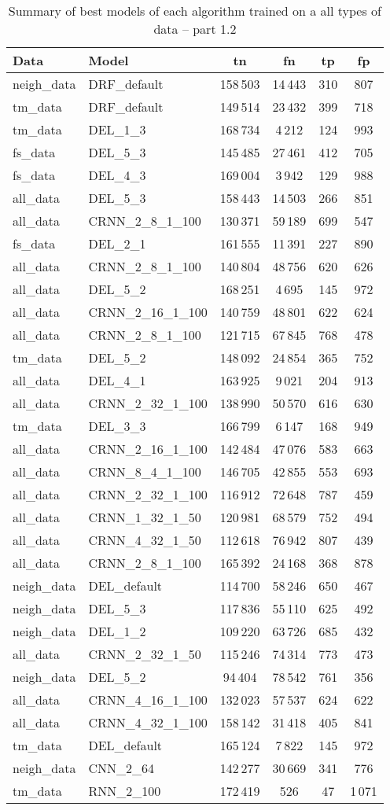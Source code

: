 \documentclass[thesis=M,english]{FITthesis}[2012/10/20]
\begin{document}
\begin{table}[H]\centering
\begin{small}
    \caption{Summary of best models of each algorithm trained on a all types of data -- part 1.2}\label{tab:all_data_summary_1_2}
    \begin{tabular}{|l|l|c|c|c|c|}\hline
Data & Model & \gls{tn} & \gls{fn} & \gls{tp} & \gls{fp} \tabularnewline \hline \hline
neigh\_data & DRF\_default & 158\,503 & 14\,443 & 310 & 807 \tabularnewline  \hline 
tm\_data & DRF\_default & 149\,514 & 23\,432 & 399 & 718 \tabularnewline  \hline 
tm\_data & DEL\_1\_3 & 168\,734 & 4\,212 & 124 & 993 \tabularnewline  \hline 
fs\_data & DEL\_5\_3 & 145\,485 & 27\,461 & 412 & 705 \tabularnewline  \hline 
fs\_data & DEL\_4\_3 & 169\,004 & 3\,942 & 129 & 988 \tabularnewline  \hline 
all\_data & DEL\_5\_3 & 158\,443 & 14\,503 & 266 & 851 \tabularnewline  \hline 
all\_data & CRNN\_2\_8\_1\_100 & 130\,371 & 59\,189 & 699 & 547 \tabularnewline  \hline 
fs\_data & DEL\_2\_1 & 161\,555 & 11\,391 & 227 & 890 \tabularnewline  \hline 
all\_data & CRNN\_2\_8\_1\_100 & 140\,804 & 48\,756 & 620 & 626 \tabularnewline  \hline 
all\_data & DEL\_5\_2 & 168\,251 & 4\,695 & 145 & 972 \tabularnewline  \hline 
all\_data & CRNN\_2\_16\_1\_100 & 140\,759 & 48\,801 & 622 & 624 \tabularnewline  \hline 
all\_data & CRNN\_2\_8\_1\_100 & 121\,715 & 67\,845 & 768 & 478 \tabularnewline  \hline 
tm\_data & DEL\_5\_2 & 148\,092 & 24\,854 & 365 & 752 \tabularnewline  \hline 
all\_data & DEL\_4\_1 & 163\,925 & 9\,021 & 204 & 913 \tabularnewline  \hline 
all\_data & CRNN\_2\_32\_1\_100 & 138\,990 & 50\,570 & 616 & 630 \tabularnewline  \hline 
tm\_data & DEL\_3\_3 & 166\,799 & 6\,147 & 168 & 949 \tabularnewline  \hline 
all\_data & CRNN\_2\_16\_1\_100 & 142\,484 & 47\,076 & 583 & 663 \tabularnewline  \hline 
all\_data & CRNN\_8\_4\_1\_100 & 146\,705 & 42\,855 & 553 & 693 \tabularnewline  \hline 
all\_data & CRNN\_2\_32\_1\_100 & 116\,912 & 72\,648 & 787 & 459 \tabularnewline  \hline 
all\_data & CRNN\_1\_32\_1\_50 & 120\,981 & 68\,579 & 752 & 494 \tabularnewline  \hline 
all\_data & CRNN\_4\_32\_1\_50 & 112\,618 & 76\,942 & 807 & 439 \tabularnewline  \hline 
all\_data & CRNN\_2\_8\_1\_100 & 165\,392 & 24\,168 & 368 & 878 \tabularnewline  \hline 
neigh\_data & DEL\_default & 114\,700 & 58\,246 & 650 & 467 \tabularnewline  \hline 
neigh\_data & DEL\_5\_3 & 117\,836 & 55\,110 & 625 & 492 \tabularnewline  \hline 
neigh\_data & DEL\_1\_2 & 109\,220 & 63\,726 & 685 & 432 \tabularnewline  \hline 
all\_data & CRNN\_2\_32\_1\_50 & 115\,246 & 74\,314 & 773 & 473 \tabularnewline  \hline 
neigh\_data & DEL\_5\_2 & 94\,404 & 78\,542 & 761 & 356 \tabularnewline  \hline 
all\_data & CRNN\_4\_16\_1\_100 & 132\,023 & 57\,537 & 624 & 622 \tabularnewline  \hline 
all\_data & CRNN\_4\_32\_1\_100 & 158\,142 & 31\,418 & 405 & 841 \tabularnewline  \hline 
tm\_data & DEL\_default & 165\,124 & 7\,822 & 145 & 972 \tabularnewline  \hline 
neigh\_data & CNN\_2\_64 & 142\,277 & 30\,669 & 341 & 776 \tabularnewline  \hline 
tm\_data & RNN\_2\_100 & 172\,419 & 526 & 47 & 1\,071 \tabularnewline  \hline 
    \end{tabular}
\end{small}
\end{table}
\end{document}

